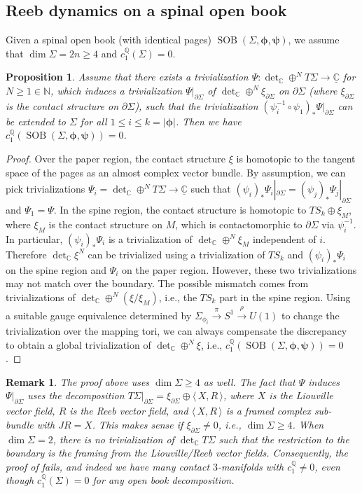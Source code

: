 \documentclass[11pt]{amsart}
\numberwithin{equation}{section}
\newtheorem{proposition}[theorem]{\textbf{Proposition}}
\newtheorem{remark}[theorem]{\textbf{Remark}}
\def\N{{\mathbb N}}
\def\C{{\mathbb C}}
\def\Q{{\mathbb Q}}
\def\la{\langle\,}
\def\ra{\,\rangle}
\DeclareMathOperator{\SOB}{SOB}
\begin{document}
\subsection{Reeb dynamics on a spinal open book}
Given a spinal open book (with identical pages) $\SOB(\Sigma,\bm{\phi},\bm{\psi})$, we assume that $\dim \Sigma =2n\ge 4$ and $c_1^{\Q}(\Sigma)=0$. 
\begin{proposition}\label{prop:c1}
    Assume that there exists a trivialization $\Psi: \det_{\C}\oplus^N T\Sigma\to \underline{\C}$ for $N\ge 1 \in \N$, which induces a trivialization $\Psi|_{\partial \Sigma}$ of $\det_{\C}\oplus^N \xi_{\partial \Sigma}$ on $\partial \Sigma$ (where $\xi_{\partial \Sigma}$ is the contact structure on $\partial \Sigma$), such that the trivialization $(\psi_i^{-1}\circ \psi_1)_*\Psi|_{\partial \Sigma}$ can be extended to $\Sigma$ for all $1\le i \le k=|\bm{\phi}|$. Then we have $c_1^{\Q}(\SOB(\Sigma,\bm{\phi},\bm{\psi}))=0$.
\end{proposition}
\begin{proof}
Over the paper region, the contact structure $\xi$ is homotopic to the tangent space of the pages as an almost complex vector bundle. By assumption, we can pick trivializations $\Psi_i=\det_{\C}\oplus^N T\Sigma \to \underline{\C}$ such that $(\psi_i)_*\Psi_i|_{\partial \Sigma} = (\psi_j)_*\Psi_j|_{\partial \Sigma}$ and $\Psi_1=\Psi$. In the spine region, the contact structure is homotopic to $TS_{k}\oplus \xi_{M}$, where $\xi_{M}$ is the contact structure on $M$, which is contactomorphic to $\partial \Sigma$ via $\psi_i^{-1}$. In particular, $(\psi_i)_*\Psi_i$ is a trivialization of $\det_{\C}\oplus^N \xi_M$ independent of $i$. Therefore $\det_{\C}\xi^N$ can be trivialized using a trivialization of $TS_{k}$ and $(\psi_i)_*\Psi_i$ on the spine region and $\Psi_i$ on the paper region. However, these two trivializations may not match over the boundary. The possible mismatch comes from trivializations of $\det_{\C}\oplus^N(\xi/\xi_M)$, i.e., the $TS_k$ part in the spine region. Using a suitable gauge equivalence determined by $\Sigma_{\phi_i}\stackrel{\pi}{\to} S^1 \stackrel{\rho}{\to} U(1)$ to change the trivialization over the mapping tori, we can always compensate the discrepancy to obtain a global trivialization of $\det_{\C}\oplus^N\xi$, i.e., $c_1^{\Q}(\SOB(\Sigma,\bm{\phi},\bm{\psi}))=0$.
\end{proof}

\begin{remark}
    The proof above uses $\dim \Sigma \ge 4$ as well. The fact that $\Psi$ induces $\Psi|_{\partial \Sigma}$ uses the decomposition $T\Sigma|_{\partial \Sigma}=\xi_{\partial \Sigma}\oplus \la X, R \ra$, where $X$ is the Liouville vector field, $R$ is the Reeb vector field, and $\la X,R \ra$ is a framed complex sub-bundle with $JR=X$. This makes sense if $\xi_{\partial \Sigma}\ne 0$, i.e., $\dim \Sigma \ge 4$. When $\dim \Sigma = 2$, there is no trivialization of $\det_{\C}T\Sigma$ such that the restriction to the boundary is the framing from the Liouville/Reeb vector fields. Consequently, the proof of  fails, and indeed we have many contact $3$-manifolds with $c_1^{\Q}\ne 0$, even though $c_1^{\Q}(\Sigma)=0$ for any open book decomposition. 
\end{remark}
\end{document}
